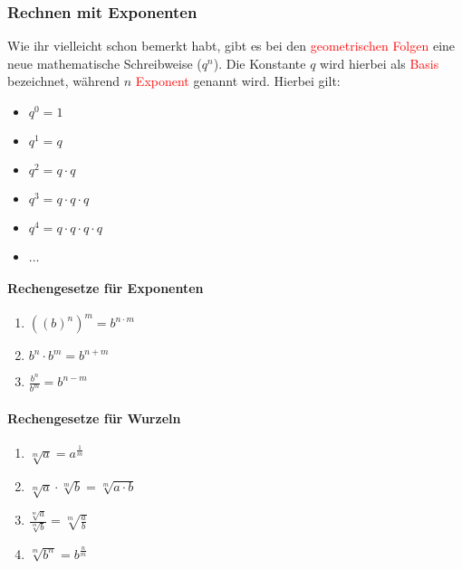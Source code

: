 \subsubsection{Rechnen mit Exponenten}
Wie ihr vielleicht schon bemerkt habt, gibt es bei den \textcolor{red}{geometrischen Folgen} eine neue mathematische Schreibweise ($q^n$). Die Konstante $q$ wird hierbei als \textcolor{red}{Basis} bezeichnet, während $n$ \textcolor{red}{Exponent} genannt wird. Hierbei gilt:
\begin{itemize}
\item $q^0 = 1$
\item $q^1 = q$
\item $q^2 = q \cdot q$
\item $q^3 = q \cdot q \cdot q$
\item $q^4 = q \cdot q \cdot q \cdot q$
\item $\ldots$
\end{itemize}

\paragraph{Rechengesetze für Exponenten}
\begin{enumerate}
\item $((b)^n)^m = b^{n \cdot m}$
\item $b^n \cdot b^m = b^{n+m}$
\item $\frac{b^n}{b^m} = b^{n-m}$
\end{enumerate}

\paragraph{Rechengesetze für Wurzeln}
\begin{enumerate}
\item $\sqrt[m]{a} = a^{\frac{1}{m}}$
\item $\sqrt[m]{a} \cdot \sqrt[m]{b} = \sqrt[m]{a \cdot b}$
\item $\frac{\sqrt[m]{a}}{\sqrt[m]{b}} = \sqrt[m]{\frac{a}{b}}$
\item $\sqrt[m]{b^n} = b^{\frac{n}{m}}$
\end{enumerate}